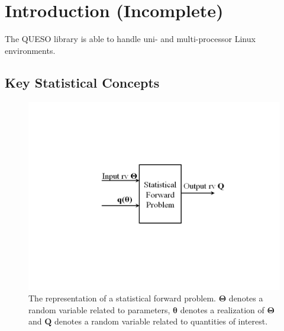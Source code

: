 \chapter{Introduction (Incomplete)}\label{ch-introduction}
\thispagestyle{headings}


The QUESO library is able to handle uni- and multi-processor Linux
environments.


\section{Key Statistical Concepts}

\begin{figure}[h!]
\centerline{
\includegraphics[scale=0.45,clip=true,viewport=1.0in 2.5in 10.0in 5.5in]{figs/queso_paper1_09}
}
\caption{
The representation of a statistical forward problem.
$\boldsymbol{\Theta}$ denotes a random variable related to parameters,
$\boldsymbol{\theta}$ denotes a realization of $\boldsymbol{\Theta}$ and
$\mathbf{Q}$ denotes a random variable related to quantities of interest.
}
\label{fig-sfp-queso}
\end{figure}

